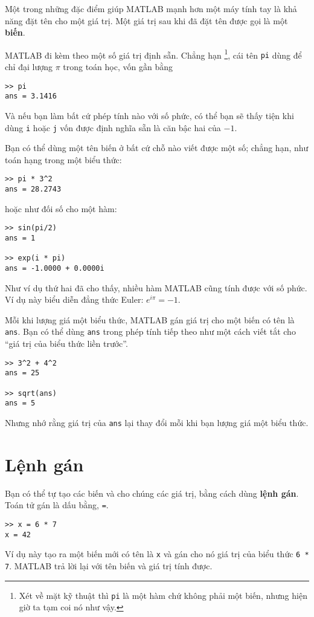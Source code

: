 \documentclass[12pt]{book}
\begin{document}
Một trong những đặc điểm giúp MATLAB mạnh hơn một máy tính tay
là khả năng đặt tên cho một giá trị. Một giá trị sau khi đã đặt tên
được gọi là một {\bf biến}.

MATLAB đi kèm theo một số giá trị định sẵn. Chẳng hạn
\footnote{Xét về mặt kỹ thuật thì {\tt pi} là một hàm chứ không phải
một biến, nhưng hiện giờ ta tạm coi nó như vậy.}, cái tên {\tt pi} dùng để chỉ
đại lượng $\pi$ trong toán học, vốn gần bằng

\begin{verbatim}
>> pi
ans = 3.1416
\end{verbatim}

Và nếu bạn làm bất cứ phép tính nào với số phức, có thể bạn sẽ thấy tiện
khi dùng {\tt i} hoặc {\tt j} vốn được định nghĩa sẵn là căn bậc hai 
của $-1$.

Bạn có thể dùng một tên biến ở bất cứ chỗ nào viết được một số; chẳng hạn,
như toán hạng trong một biểu thức:

\begin{verbatim}
>> pi * 3^2
ans = 28.2743
\end{verbatim}
%
\noindent hoặc như đối số cho một hàm:

\begin{verbatim}
>> sin(pi/2)
ans = 1

>> exp(i * pi)
ans = -1.0000 + 0.0000i
\end{verbatim}
%
Như ví dụ thứ hai đã cho thấy, nhiều hàm MATLAB cũng tính được
với số phức. Ví dụ này biểu diễn đẳng thức Euler:
$e^{i \pi} = -1$.

Mỗi khi lượng giá một biểu thức, MATLAB gán giá trị cho một biến
có tên là {\tt ans}.  Bạn có thể dùng {\tt ans} trong phép tính tiếp
theo như một cách viết tắt cho ``giá trị của biểu thức liền trước''.

\begin{verbatim}
>> 3^2 + 4^2
ans = 25

>> sqrt(ans)
ans = 5
\end{verbatim}
%
Nhưng nhớ rằng giá trị của {\tt ans} lại thay đổi mỗi khi bạn lượng
giá một biểu thức.


\section{Lệnh gán}

Bạn có thể tự tạo các biến và cho chúng các giá trị, bằng cách dùng
{\bf lệnh gán}. Toán tử gán là dấu bằng, {\tt =}.

\begin{verbatim}
>> x = 6 * 7
x = 42
\end{verbatim}
%
Ví dụ này tạo ra một biến mới có tên là {\tt x} và gán cho nó giá trị
của biểu thức {\tt 6 * 7}.  MATLAB trả lời lại với tên biến và
giá trị tính được.
\end{document}
